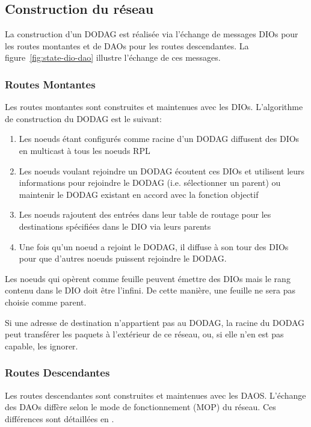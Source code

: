 \subsection*{Construction du réseau}
    La construction d'un DODAG est réalisée via l'échange de messages DIOs pour les routes montantes et de DAOs pour les routes descendantes. La figure~\ref{fig:state-dio-dao} illustre l'échange de ces messages.

\subsubsection*{Routes Montantes}
    Les routes montantes sont construites et maintenues avec les DIOs.
    L'algorithme de construction du DODAG est le suivant:
    \begin{enumerate}
        \item Les noeuds étant configurés comme racine d'un DODAG diffusent des DIOs en multicast à tous les noeuds RPL
        \item Les noeuds voulant rejoindre un DODAG écoutent ces DIOs et utilisent leurs informations pour rejoindre le DODAG (i.e. sélectionner un parent) ou maintenir le DODAG existant en accord avec la fonction objectif
        \item Les noeuds rajoutent des entrées dans leur table de routage pour les destinations spécifiées dans le DIO via leurs parents
        \item Une fois qu'un noeud a rejoint le DODAG, il diffuse à son tour des DIOs pour que d'autres noeuds puissent rejoindre le DODAG.
    \end{enumerate}

    Les noeuds qui opèrent comme feuille peuvent émettre des DIOs mais le rang contenu dans le DIO doit être l'infini. De cette manière, une feuille ne sera pas choisie comme parent.

    Si une adresse de destination n'appartient pas au DODAG, la racine du DODAG peut transférer les paquets à l'extérieur de ce réseau, ou, si elle n'en est pas capable, les ignorer.     

\subsubsection*{Routes Descendantes}
    Les routes descendantes sont construites et maintenues avec les DAOS.
    L'échange des DAOs diffère selon le mode de fonctionnement (MOP) du réseau. Ces différences sont détaillées en .

